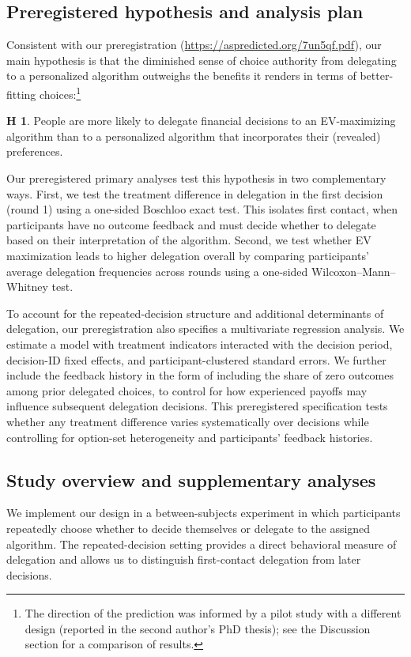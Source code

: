 \documentclass[a4paper, 12pt, fleqn]{article}
\theoremstyle{definition}
\newtheorem{hyp}{H}
\begin{document}
\subsection*{Preregistered hypothesis and analysis plan}
Consistent with our preregistration ({\scriptsize\url{https://aspredicted.org/7un5qf.pdf}}), our main hypothesis is that the diminished sense of choice authority from delegating to a personalized algorithm outweighs the benefits it renders in terms of better-fitting choices:\footnote{The direction of the prediction was informed by a pilot study with a different design (reported in the second author's PhD thesis); see the Discussion section for a comparison of results.}
\begin{hyp}
	People are more likely to delegate financial decisions to an EV-maximizing algorithm than to a personalized algorithm that incorporates their (revealed) preferences.
\end{hyp}

Our preregistered primary analyses test this hypothesis in two complementary ways. First, we test the treatment difference in delegation in the first decision (round 1) using a one-sided Boschloo exact test. This isolates first contact, when participants have no outcome feedback and must decide whether to delegate based on their interpretation of the algorithm. Second, we test whether EV maximization leads to higher delegation overall by comparing participants' average delegation frequencies across rounds using a one-sided Wilcoxon--Mann--Whitney test.

To account for the repeated-decision structure and additional determinants of delegation, our preregistration also specifies a multivariate regression analysis. We estimate a model with treatment indicators interacted with the decision period, decision-ID fixed effects, and participant-clustered standard errors. We further include the feedback history in the form of including the share of zero outcomes among prior delegated choices, to control for how experienced payoffs may influence subsequent delegation decisions. This preregistered specification tests whether any treatment difference varies systematically over decisions while controlling for option-set heterogeneity and participants' feedback histories.

\subsection*{Study overview and supplementary analyses}
We implement our design in a between-subjects experiment in which participants repeatedly choose whether to decide themselves or delegate to the assigned algorithm. The repeated-decision setting provides a direct behavioral measure of delegation and allows us to distinguish first-contact delegation from later decisions.
\end{document}
